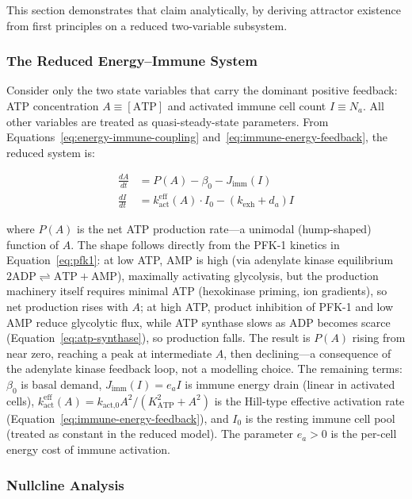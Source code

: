 This section demonstrates that claim analytically, by deriving attractor existence from first principles on a reduced two-variable subsystem.

\subsubsection{The Reduced Energy--Immune System}
\label{sec:reduced-2d}

Consider only the two state variables that carry the dominant positive feedback: ATP concentration $A \equiv [\text{ATP}]$ and activated immune cell count $I \equiv N_a$. All other variables are treated as quasi-steady-state parameters. From Equations~\ref{eq:energy-immune-coupling} and~\ref{eq:immune-energy-feedback}, the reduced system is:

\begin{align}
\frac{dA}{dt} &= P(A) - \beta_0 - J_{\text{imm}}(I) \label{eq:reduced-atp} \\
\frac{dI}{dt} &= k_{\text{act}}^{\text{eff}}(A) \cdot I_0 - (k_{\text{exh}} + d_a) I \label{eq:reduced-immune}
\end{align}

where $P(A)$ is the net ATP production rate---a unimodal (hump-shaped) function of $A$. The shape follows directly from the PFK-1 kinetics in Equation~\ref{eq:pfk1}: at low ATP, AMP is high (via adenylate kinase equilibrium $2\text{ADP} \rightleftharpoons \text{ATP} + \text{AMP}$), maximally activating glycolysis, but the production machinery itself requires minimal ATP (hexokinase priming, ion gradients), so net production rises with $A$; at high ATP, product inhibition of PFK-1 and low AMP reduce glycolytic flux, while ATP synthase slows as ADP becomes scarce (Equation~\ref{eq:atp-synthase}), so production falls. The result is $P(A)$ rising from near zero, reaching a peak at intermediate $A$, then declining---a consequence of the adenylate kinase feedback loop, not a modelling choice. The remaining terms: $\beta_0$ is basal demand, $J_{\text{imm}}(I) = e_a I$ is immune energy drain (linear in activated cells), $k_{\text{act}}^{\text{eff}}(A) = k_{\text{act,0}} A^2 / (K_{\text{ATP}}^2 + A^2)$ is the Hill-type effective activation rate (Equation~\ref{eq:immune-energy-feedback}), and $I_0$ is the resting immune cell pool (treated as constant in the reduced model). The parameter $e_a > 0$ is the per-cell energy cost of immune activation.

\subsubsection{Nullcline Analysis}
\label{sec:nullcline-analysis}

